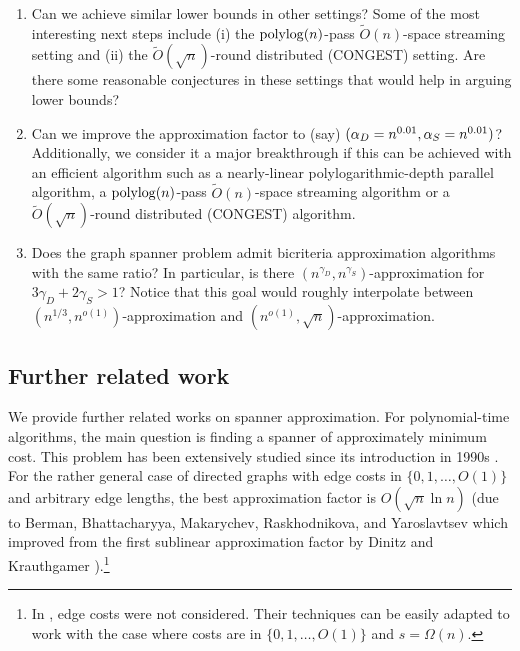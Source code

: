\begin{enumerate}
\item Can we achieve similar lower bounds in other settings? Some of the most interesting next steps include (i) the $\mathrm{polylog}(n)$-pass $\tilde O(n)$-space streaming setting and (ii) the $\tilde O(\sqrt{n})$-round distributed (CONGEST) setting. Are there some reasonable conjectures in these settings that would help in arguing lower bounds?
\item Can we improve the approximation factor to (say) $(\alpha_D=n^{0.01}, \alpha_S=n^{0.01})$? Additionally, we consider it a major breakthrough if this can be achieved with an efficient algorithm such as a nearly-linear polylogarithmic-depth parallel algorithm, a $\mathrm{polylog}(n)$-pass $\tilde O(n)$-space streaming algorithm or a $\tilde O(\sqrt{n})$-round distributed (CONGEST) algorithm. 

\item Does the graph spanner problem admit bicriteria approximation algorithms with the same ratio? In particular, is there $(n^{\gamma_D}, n^{\gamma_S})$-approximation for $3\gamma_D + 2\gamma_S >1$? Notice that this goal would roughly interpolate between $(n^{1/3}, n^{o(1)})$-approximation and $(n^{o(1)},\sqrt{n})$-approximation. 
\end{enumerate}


\subsection{Further related work}


































\label{sec:intro:spanner}
We provide further related works on spanner approximation. 
For polynomial-time algorithms, the main question is finding a spanner of approximately minimum cost. This problem has been extensively studied since its introduction in 1990s \cite{KortsarzP94}. 
For the rather general case of directed graphs with edge costs in $\{0, 1, \ldots, O(1)\}$ and arbitrary edge lengths, the best approximation factor is $O(\sqrt{n}\ln{n})$ (due to Berman, Bhattacharyya, Makarychev, Raskhodnikova, and Yaroslavtsev \cite{BermanBMRY11} which improved from the first sublinear approximation factor by Dinitz and Krauthgamer \cite{DinitzK11}).\footnote{In \cite{BermanBMRY11}, edge costs were not considered. Their techniques can be easily adapted to work with the case where costs are in $\{0, 1, \ldots, O(1)\}$ and $s=\Omega(n)$.} 


